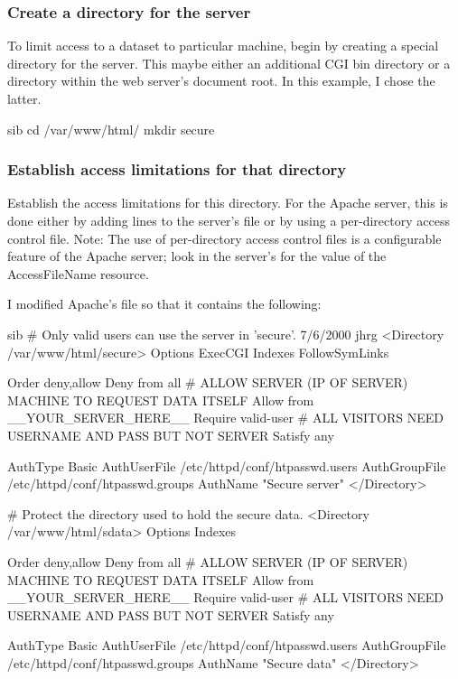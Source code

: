 \documentclass{dods-book}
\begin{document}
\subsubsection{Create a directory for the server}

To limit access to a  dataset to particular machine, begin by creating a
special directory for the server. This maybe either an additional CGI bin
directory or a directory within the web server's document root. In this
example, I chose the latter.

\begin{vcode}{sib}
    cd /var/www/html/
    mkdir secure
\end{vcode}

\subsubsection{Establish access limitations for that directory}

Establish the access limitations for this directory. For the Apache
server, this is done either by adding lines to the server's
 file or by using a per-directory access control file.
Note: The use of per-directory access control files is a configurable
feature of the Apache server; look in the server's  for the value of the AccessFileName resource.

I modified Apache's  file so that it contains the
following:

\begin{vcode}{sib}
    # Only valid users can use the server in 'secure'. 7/6/2000 jhrg
    <Directory /var/www/html/secure>
        Options ExecCGI Indexes FollowSymLinks

        Order deny,allow
        Deny from all
        # ALLOW SERVER (IP OF SERVER) MACHINE TO REQUEST DATA ITSELF
        Allow from __YOUR_SERVER_HERE__ 
        Require valid-user
        # ALL VISITORS NEED USERNAME AND PASS BUT NOT SERVER
        Satisfy any

        AuthType Basic 
        AuthUserFile /etc/httpd/conf/htpasswd.users 
        AuthGroupFile /etc/httpd/conf/htpasswd.groups
        AuthName "Secure server"
    </Directory>

    # Protect the directory used to hold the secure data.
    <Directory /var/www/html/sdata>
        Options Indexes

        Order deny,allow
        Deny from all
        # ALLOW SERVER (IP OF SERVER) MACHINE TO REQUEST DATA ITSELF
        Allow from __YOUR_SERVER_HERE__ 
        Require valid-user
        # ALL VISITORS NEED USERNAME AND PASS BUT NOT SERVER
        Satisfy any

        AuthType Basic 
        AuthUserFile /etc/httpd/conf/htpasswd.users 
        AuthGroupFile /etc/httpd/conf/htpasswd.groups
        AuthName "Secure data"
    </Directory>
\end{vcode}
\end{document}
